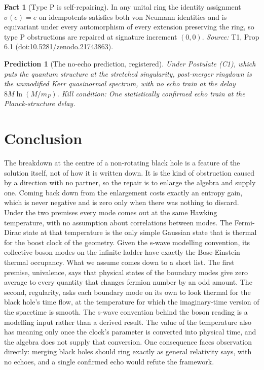 \documentclass[11pt]{article}
\newtheorem{prediction}[theorem]{Prediction}
\theoremstyle{definition}
\newtheorem{fact}[theorem]{Fact}
\theoremstyle{plain}
\begin{document}
\begin{fact}[Type P is self-repairing]\label{c:transport.type-p-self-repairing}
In any unital ring the identity assignment $\sigma(e) = e$ on idempotents satisfies both von Neumann identities and is equivariant under every automorphism of every extension preserving the ring, so type P obstructions are repaired at signature increment $(0,0)$.
\emph{Source:} T1, Prop 6.1 (\href{https://doi.org/10.5281/zenodo.21743863}{doi:10.5281/zenodo.21743863}).
\end{fact}

\begin{prediction}[The no-echo prediction, registered]\label{c:scrambling.no-echo-prediction-registered}
Under Postulate (C1), which puts the quantum structure at the stretched singularity, post-merger ringdown is the unmodified Kerr quasinormal spectrum, with no echo train at the delay $8M\ln(M/m_P)$.
\emph{Kill condition:} One statistically confirmed echo train at the Planck-structure delay.
\end{prediction}

\section*{Conclusion}
The breakdown at the centre of a non-rotating black hole is a feature of the solution itself, not of how it is written down. It is the kind of obstruction caused by a direction with no partner, so the repair is to enlarge the algebra and supply one. Coming back down from the enlargement costs exactly an entropy gain, which is never negative and is zero only when there was nothing to discard. Under the two premises every mode comes out at the same Hawking temperature, with no assumption about correlations between modes. The Fermi-Dirac state at that temperature is the only simple Gaussian state that is thermal for the boost clock of the geometry. Given the s-wave modelling convention, its collective boson modes on the infinite ladder have exactly the Bose-Einstein thermal occupancy. What we assume comes down to a short list. The first premise, univalence, says that physical states of the boundary modes give zero average to every quantity that changes fermion number by an odd amount. The second, regularity, asks each boundary mode on its own to look thermal for the black hole's time flow, at the temperature for which the imaginary-time version of the spacetime is smooth. The s-wave convention behind the boson reading is a modelling input rather than a derived result. The value of the temperature also has meaning only once the clock's parameter is converted into physical time, and the algebra does not supply that conversion. One consequence faces observation directly: merging black holes should ring exactly as general relativity says, with no echoes, and a single confirmed echo would refute the framework.
\end{document}
